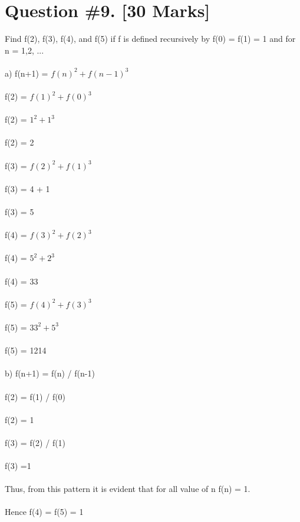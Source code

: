 \documentclass{article}
\begin{document}
\section{Question \#9. [30 Marks]}
Find f(2), f(3), f(4), and f(5) if f is defined recursively by f(0) = f(1) = 1 and for n = 1,2, ... \\\\
a) f(n+1) = $f(n)^2 + f(n-1)^3$ \\\\
f(2) = $f(1)^2 + f(0)^3$  \\\\
f(2)  = $1^2 + 1^3$ \\\\
f(2)  = 2  \\\\
f(3) = $f(2)^2 + f(1)^3$ \\\\
f(3) = 4 + 1 \\ \\
f(3) = 5 \\\\
f(4) = $f(3)^2 + f(2)^3$ \\\\
f(4) = $ 5^2 + 2^3$ \\\\
f(4)  = 33 \\\\
f(5) = $f(4)^2 + f(3)^3$ \\\\
f(5) = $33^2 + 5^3$ \\\\
f(5)  = 1214 \\\\
b) f(n+1) = f(n) / f(n-1) \\\\
f(2) = f(1) / f(0) \\\\
f(2) = 1 \\\\
f(3) = f(2) / f(1) \\\\ 
f(3) =1  \\\\
Thus, from this pattern it is evident that for all value of n f(n) = 1. \\\\Hence f(4) = f(5) = 1
\begin{center}
\end{center}
\newpage
\end{document}
